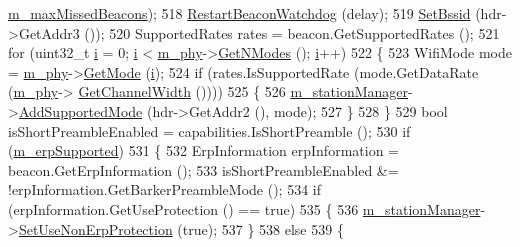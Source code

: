 \begin{DoxyCode}
      \hyperlink{classns3_1_1StaWifiMac_a725655d9a8bb335d6156a0c0a5b0753f}{m\_maxMissedBeacons});
518           \hyperlink{classns3_1_1StaWifiMac_a873848ee518a0190f8feb3551f3d5969}{RestartBeaconWatchdog} (delay);
519           \hyperlink{classns3_1_1RegularWifiMac_a24af45a5447f736b996a48a0db584e99}{SetBssid} (hdr->GetAddr3 ());
520           SupportedRates rates = beacon.GetSupportedRates ();
521           \textcolor{keywordflow}{for} (uint32\_t \hyperlink{bernuolliDistribution_8m_a6f6ccfcf58b31cb6412107d9d5281426}{i} = 0; \hyperlink{bernuolliDistribution_8m_a6f6ccfcf58b31cb6412107d9d5281426}{i} < \hyperlink{classns3_1_1RegularWifiMac_a1a6dad8eb0a057a4e1b459f518457a4c}{m\_phy}->\hyperlink{classns3_1_1WifiPhy_a2467e56b69d64bb2d648302f39397317}{GetNModes} (); \hyperlink{bernuolliDistribution_8m_a6f6ccfcf58b31cb6412107d9d5281426}{i}++)
522             \{
523               WifiMode mode = \hyperlink{classns3_1_1RegularWifiMac_a1a6dad8eb0a057a4e1b459f518457a4c}{m\_phy}->\hyperlink{classns3_1_1WifiPhy_ac35983a13a769a7fbaac43340b8cdaf2}{GetMode} (\hyperlink{bernuolliDistribution_8m_a6f6ccfcf58b31cb6412107d9d5281426}{i});
524               \textcolor{keywordflow}{if} (rates.IsSupportedRate (mode.GetDataRate (\hyperlink{classns3_1_1RegularWifiMac_a1a6dad8eb0a057a4e1b459f518457a4c}{m\_phy}->
      \hyperlink{classns3_1_1WifiPhy_a4a5d5009b3b3308f2baeed42a2007189}{GetChannelWidth} ())))
525                 \{
526                   \hyperlink{classns3_1_1RegularWifiMac_a76d1a5e27b64bfe36f24a55d1eea2775}{m\_stationManager}->\hyperlink{classns3_1_1WifiRemoteStationManager_a90f4d6b042c2692493446d36a3de799f}{AddSupportedMode} (hdr->GetAddr2 (), 
      mode);
527                 \}
528             \}
529           \textcolor{keywordtype}{bool} isShortPreambleEnabled = capabilities.IsShortPreamble ();
530           \textcolor{keywordflow}{if} (\hyperlink{classns3_1_1RegularWifiMac_ab90230e9a9ea6331758a53a316ee2b38}{m\_erpSupported})
531             \{
532               ErpInformation erpInformation = beacon.GetErpInformation ();
533               isShortPreambleEnabled &= !erpInformation.GetBarkerPreambleMode ();
534               \textcolor{keywordflow}{if} (erpInformation.GetUseProtection () == \textcolor{keyword}{true})
535                 \{
536                   \hyperlink{classns3_1_1RegularWifiMac_a76d1a5e27b64bfe36f24a55d1eea2775}{m\_stationManager}->\hyperlink{classns3_1_1WifiRemoteStationManager_a409e92951019a05af1266a30c14995d2}{SetUseNonErpProtection} (\textcolor{keyword}{true});
537                 \}
538               \textcolor{keywordflow}{else}
539                 \{

\end{DoxyCode}
